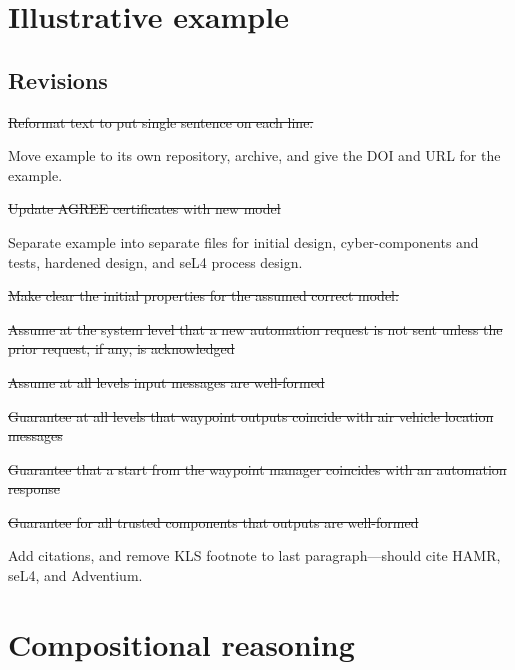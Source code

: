 \documentclass[global,twocolumn]{svjour}
\begin{document}
\section{Illustrative example}
\label{sec:example}


\subsection{Revisions}
\begin{compactitem}
  \item \sout{Reformat text to put single sentence on each line.}
  \item Move example to its own repository, archive, and give the DOI and URL for the example.
  \item \sout{Update AGREE certificates with new model}
  \item Separate example into separate files for initial design, cyber-components and tests, hardened design, and seL4 process design.
  \item \sout{Make clear the initial properties for the assumed correct model:}
    \begin{compactitem}
      \item \sout{Assume at the system level that a new automation request is not sent unless the prior request, if any, is acknowledged}
      \item \sout{Assume at all levels input messages are well-formed}
      \item \sout{Guarantee at all levels that waypoint outputs coincide with air vehicle location messages}
      \item \sout{Guarantee that a start from the waypoint manager coincides with an automation response}
      \item \sout{Guarantee for all trusted components that outputs are well-formed}
    \end{compactitem}
  \item Add citations, and remove KLS footnote to last paragraph---should cite HAMR, seL4, and Adventium.
\end{compactitem}

\section{Compositional reasoning}
\label{sec:agree}

\end{document}
